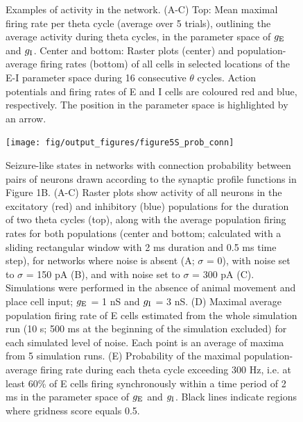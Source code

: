 \documentclass[a4paper,12pt]{article}
\newcommand{\ssc}[3]{\ensuremath{#1_{\text{#2}_{\text{#3}}}}}
\newcommand{\gE      }{\ssc{g}      {\scriptsize{E}}{}}
\newcommand{\gI      }{\ssc{g}      {\scriptsize{I}}{}}
\begin{document}
\clearpage

\setcounter{figure}{0}
\renewcommand{\figurename}{Figure 5 - figure supplement}

\begin{figure}[H]
    \internallinenumbers
    \caption{Examples of activity in the network. (A-C) Top: Mean maximal
    firing rate per theta cycle (average over 5 trials), outlining the average
    activity during theta cycles, in the parameter space of $\gE$ and $\gI$.
    Center and bottom: Raster plots (center) and population-average firing
    rates (bottom) of all cells in selected locations of the E-I parameter
    space during 16 consecutive $\theta$ cycles. Action potentials and firing
    rates of E and I cells are coloured red and blue, respectively. The position
    in the parameter space is highlighted by an arrow.}
\end{figure}

\clearpage

\begin{figure}[p]
    \internallinenumbers
    \centering
        \texttt{[image: fig/output\_figures/figure5S\_prob\_conn]}
\end{figure}

\clearpage

\begin{figure}[H]
    \internallinenumbers
    \caption{Seizure-like states in networks with connection probability
    between pairs of neurons drawn according to the synaptic profile functions
    in Figure 1B. (A-C) Raster plots show activity of all neurons in the
    excitatory (red) and inhibitory (blue) populations for the duration of two
    theta cycles (top), along with the average population firing rates for both
    populations (center and bottom; calculated with a sliding rectangular
    window with 2 ms duration and 0.5 ms time step), for networks where noise
    is absent (A; $\sigma$ = 0), with noise set to $\sigma$ = 150 pA (B), and
    with noise set to $\sigma$ = 300 pA (C). Simulations were performed in the
    absence of animal movement and place cell input; $\gE$ = 1 nS and $\gI$ = 3 nS.
    (D) Maximal average population firing rate of E cells estimated from the
    whole simulation run (10 s; 500 ms at the beginning of the simulation
    excluded) for each simulated level of noise. Each point is an average of
    maxima from 5 simulation runs.  (E) Probability of the maximal
    population-average firing rate during each theta cycle exceeding 300 Hz,
    i.e. at least 60\% of E cells firing synchronously within a time period of
    2 ms in the parameter space of $\gE$ and $\gI$. Black lines indicate regions
    where gridness score equals 0.5.}
\end{figure}
\end{document}

